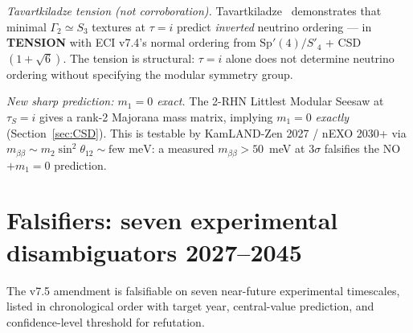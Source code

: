 \documentclass[a4paper,11pt]{article}
\theoremstyle{definition}
\theoremstyle{remark}
\begin{document}
\emph{Tavartkiladze tension (not corroboration).}
Tavartkiladze~\cite{Tavartkiladze2512} demonstrates that minimal
$\Gamma_2 \simeq S_3$ textures at $\tau=i$ predict \emph{inverted}
neutrino ordering --- in \textbf{TENSION} with ECI v7.4's normal
ordering from $\mathrm{Sp}'(4)/S'_4$ + CSD$(1+\sqrt{6})$.
The tension is structural: $\tau=i$ alone does not determine
neutrino ordering without specifying the modular symmetry group.

\emph{New sharp prediction: $m_1 = 0$ exact.}
The 2-RHN Littlest Modular Seesaw at $\tau_S=i$ gives a
rank-2 Majorana mass matrix, implying $m_1=0$ \emph{exactly}
(Section~\ref{sec:CSD}).
This is testable by KamLAND-Zen 2027 / nEXO 2030+ via
$m_{\beta\beta}\sim m_2\sin^2\theta_{12}\sim\text{few meV}$:
a measured $m_{\beta\beta}>50$~meV at $3\sigma$ falsifies
the NO$+m_1=0$ prediction.

\section{Falsifiers: seven experimental disambiguators 2027--2045}
\label{sec:falsifiers}

The v7.5 amendment is falsifiable on seven near-future
experimental timescales, listed in chronological order with
target year, central-value prediction, and confidence-level
threshold for refutation.
\end{document}
